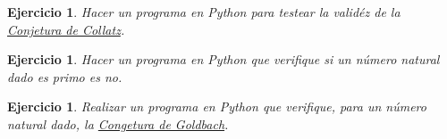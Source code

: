 \documentclass{article}
\newcounter{ejer}
\newtheorem{ejercicio}[ejer]{Ejercicio}}
\begin{document}
\begin{ejercicio} Hacer un programa en Python  para testear la valid\'ez de la \href{http://es.wikipedia.org/wiki/Conjetura_de_Collatz}{Conjetura de Collatz}.

\end{ejercicio}

\begin{ejercicio}
Hacer un programa en Python que verifique si un n\'umero natural dado es primo es no.
\end{ejercicio}

\begin{ejercicio}
Realizar un programa en Python que verifique, para un n\'umero natural dado, la \href{https://es.wikipedia.org/wiki/Conjetura_de_Goldbach}{Congetura de Goldbach}.

 
\end{ejercicio}


%
%
\end{document}
